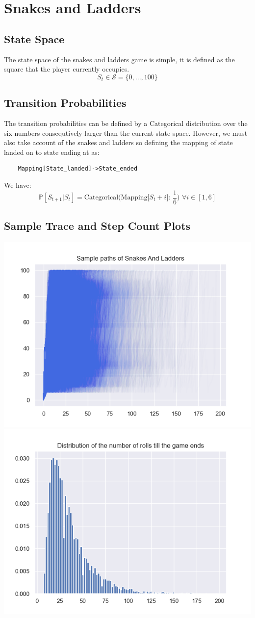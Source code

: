 \documentclass[11pt]{article}
\begin{document}
\maketitle
\thispagestyle{first}

\section{Snakes and Ladders}
\subsection{State Space}
The state space of the snakes and ladders game is simple, it is defined as the square that the player currently occupies.
$$S_t \in \mathcal{S} = \{0,..., 100\}$$

\subsection{Transition Probabilities}
The transition probabilities can be defined by a Categorical distribution over the six numbers consequtively larger than the current state space. However, we must also take account of the snakes and ladders so defining the mapping of state landed on to state ending at as:
\begin{verbatim}
    Mapping[State_landed]->State_ended
\end{verbatim}
We have:
$$
\mathbb{P}[S_{t+1}|S_t] = \text{Categorical(Mapping[$S_{t}+i$]: $\frac{1}{6}$) } \forall i \in [1, 6]
$$

\subsection{Sample Trace and Step Count Plots}
\includegraphics[width=0.49\linewidth]{Q1. Sample paths of Snakes and Ladders.png}
\includegraphics[width=0.49\linewidth]{Q1. Distribution of time to finish.png}
\end{document}
